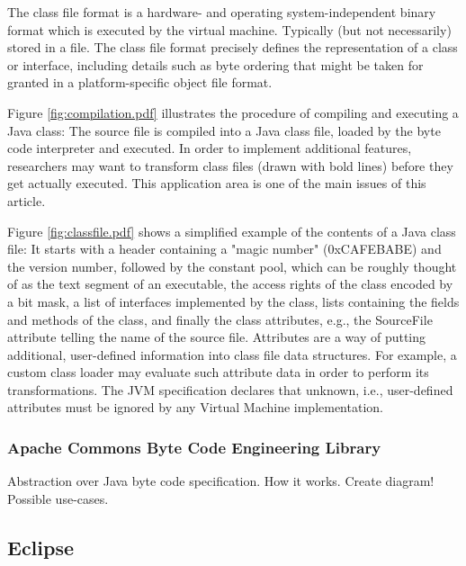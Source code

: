 The class file format is a hardware- and operating system-independent binary
format which is executed by the virtual machine. Typically (but not necessarily)
stored in a file. The class file format precisely defines the representation of a
class or interface, including details such as byte ordering that might be taken
for granted in a platform-specific object file format.

Figure \autoref{fig:compilation.pdf} illustrates the procedure of compiling and
executing a Java class: The source file is compiled into a Java class file,
loaded by the byte code interpreter and executed. In order to implement
additional features, researchers may want to transform class files (drawn with
bold lines) before they get actually executed.
This application area is one of the main issues of this article.

Figure \autoref{fig:classfile.pdf} shows a simplified example of the contents of a
Java class file: It starts with a header containing a "magic number"
(0xCAFEBABE) and the version number, followed by the constant pool, which can be
roughly thought of as the text segment of an executable, the access rights of
the class encoded by a bit mask, a list of interfaces implemented by the class,
lists containing the fields and methods of the class, and finally the class
attributes, e.g., the SourceFile attribute telling the name of the source file.
Attributes are a way of putting additional, user-defined information into class
file data structures. For example, a custom class loader may evaluate such
attribute data in order to perform its transformations. The JVM specification
declares that unknown, i.e., user-defined attributes must be ignored by any
Virtual Machine implementation.
 
\subsubsection{Apache Commons Byte Code Engineering Library}
\cite{BCEL}
Abstraction over Java byte code specification. 
How it works. Create diagram!
Possible use-cases.


\subsection{Eclipse}

